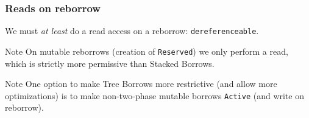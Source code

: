 \begin{frame}
    \frametitle{Reads on reborrow}
    We must \textit{at least} do a read access on a reborrow: \texttt{dereferenceable}.\\

    \begin{block}{Note}
        On mutable reborrows (creation of \texttt{Reserved}) we only perform a read,
        which is strictly more permissive than Stacked Borrows.
    \end{block}

    \begin{block}{Note}
        One option to make Tree Borrows more restrictive (and allow more optimizations)
        is to make non-two-phase mutable borrows \texttt{Active} (and write on reborrow).
    \end{block}
\end{frame}

